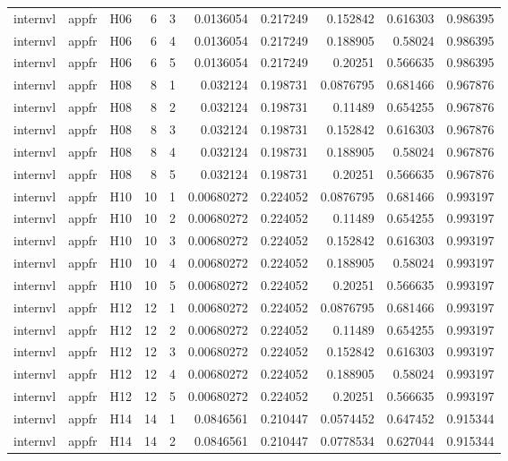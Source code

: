 \begin{longtable}{lllrrrrrrr}
internvl & appfr & H06 & 6 & 3 & 0.0136054 & 0.217249 & 0.152842 & 0.616303 & 0.986395 \\
internvl & appfr & H06 & 6 & 4 & 0.0136054 & 0.217249 & 0.188905 & 0.58024 & 0.986395 \\
internvl & appfr & H06 & 6 & 5 & 0.0136054 & 0.217249 & 0.20251 & 0.566635 & 0.986395 \\
internvl & appfr & H08 & 8 & 1 & 0.032124 & 0.198731 & 0.0876795 & 0.681466 & 0.967876 \\
internvl & appfr & H08 & 8 & 2 & 0.032124 & 0.198731 & 0.11489 & 0.654255 & 0.967876 \\
internvl & appfr & H08 & 8 & 3 & 0.032124 & 0.198731 & 0.152842 & 0.616303 & 0.967876 \\
internvl & appfr & H08 & 8 & 4 & 0.032124 & 0.198731 & 0.188905 & 0.58024 & 0.967876 \\
internvl & appfr & H08 & 8 & 5 & 0.032124 & 0.198731 & 0.20251 & 0.566635 & 0.967876 \\
internvl & appfr & H10 & 10 & 1 & 0.00680272 & 0.224052 & 0.0876795 & 0.681466 & 0.993197 \\
internvl & appfr & H10 & 10 & 2 & 0.00680272 & 0.224052 & 0.11489 & 0.654255 & 0.993197 \\
internvl & appfr & H10 & 10 & 3 & 0.00680272 & 0.224052 & 0.152842 & 0.616303 & 0.993197 \\
internvl & appfr & H10 & 10 & 4 & 0.00680272 & 0.224052 & 0.188905 & 0.58024 & 0.993197 \\
internvl & appfr & H10 & 10 & 5 & 0.00680272 & 0.224052 & 0.20251 & 0.566635 & 0.993197 \\
internvl & appfr & H12 & 12 & 1 & 0.00680272 & 0.224052 & 0.0876795 & 0.681466 & 0.993197 \\
internvl & appfr & H12 & 12 & 2 & 0.00680272 & 0.224052 & 0.11489 & 0.654255 & 0.993197 \\
internvl & appfr & H12 & 12 & 3 & 0.00680272 & 0.224052 & 0.152842 & 0.616303 & 0.993197 \\
internvl & appfr & H12 & 12 & 4 & 0.00680272 & 0.224052 & 0.188905 & 0.58024 & 0.993197 \\
internvl & appfr & H12 & 12 & 5 & 0.00680272 & 0.224052 & 0.20251 & 0.566635 & 0.993197 \\
internvl & appfr & H14 & 14 & 1 & 0.0846561 & 0.210447 & 0.0574452 & 0.647452 & 0.915344 \\
internvl & appfr & H14 & 14 & 2 & 0.0846561 & 0.210447 & 0.0778534 & 0.627044 & 0.915344 \\

\end{longtable}
